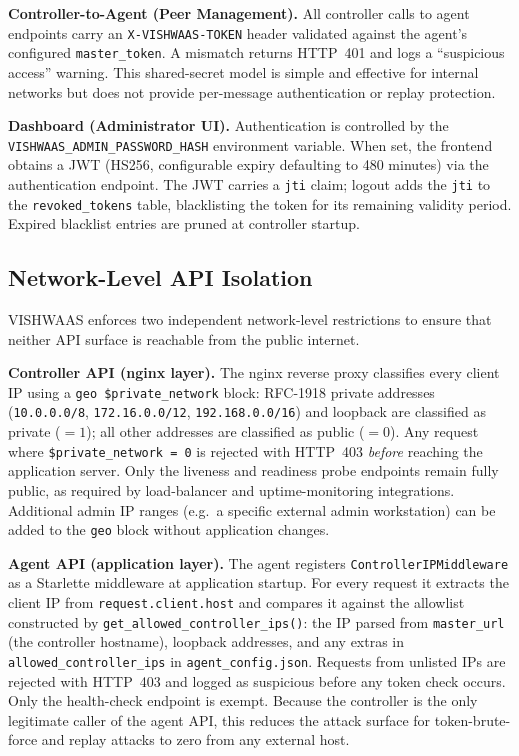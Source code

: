 \documentclass[conference]{IEEEtran}
\begin{document}
\textbf{Controller-to-Agent (Peer Management).} All controller calls to agent
endpoints carry an \texttt{X-VISHWAAS-TOKEN} header validated against the agent's
configured \texttt{master\_token}. A mismatch returns HTTP~401 and logs a
``suspicious access'' warning. This shared-secret model is simple and effective for
internal networks but does not provide per-message authentication or replay
protection.

\textbf{Dashboard (Administrator UI).} Authentication is controlled by the
\texttt{VISHWAAS\_ADMIN\_PASSWORD\_HASH} environment variable. When set, the
frontend obtains a JWT (HS256, configurable expiry defaulting to 480 minutes) via
the authentication endpoint. The JWT carries a \texttt{jti} claim; logout adds the
\texttt{jti} to the \texttt{revoked\_tokens} table, blacklisting the token for its
remaining validity period. Expired blacklist entries are pruned at controller
startup.

\subsection{Network-Level API Isolation}
\label{sec:isolation}

VISHWAAS enforces two independent network-level restrictions to ensure that neither
API surface is reachable from the public internet.

\textbf{Controller API (nginx layer).}
The nginx reverse proxy classifies every client IP using a \texttt{geo
\$private\_network} block: RFC-1918 private addresses (\texttt{10.0.0.0/8},
\texttt{172.16.0.0/12}, \texttt{192.168.0.0/16}) and loopback are classified as
private ($= 1$); all other addresses are classified as public ($= 0$). Any request
where \texttt{\$private\_network = 0} is rejected with HTTP~403 \emph{before}
reaching the application server. Only the liveness and readiness probe endpoints
remain fully public, as required by load-balancer and uptime-monitoring
integrations. Additional admin IP ranges (e.g.\ a specific external admin workstation)
can be added to the \texttt{geo} block without application changes.

\textbf{Agent API (application layer).}
The agent registers \texttt{ControllerIPMiddleware} as a Starlette middleware at
application startup. For every request it extracts the client IP from
\texttt{request.client.host} and compares it against the allowlist constructed by
\texttt{get\_allowed\_controller\_ips()}: the IP parsed from \texttt{master\_url}
(the controller hostname), loopback addresses, and any extras in
\texttt{allowed\_controller\_ips} in \texttt{agent\_config.json}. Requests from
unlisted IPs are rejected with HTTP~403 and logged as suspicious before any token
check occurs. Only the health-check endpoint is exempt. Because the controller is the
only legitimate caller of the agent API, this reduces the attack surface for
token-brute-force and replay attacks to zero from any external host.
\end{document}
